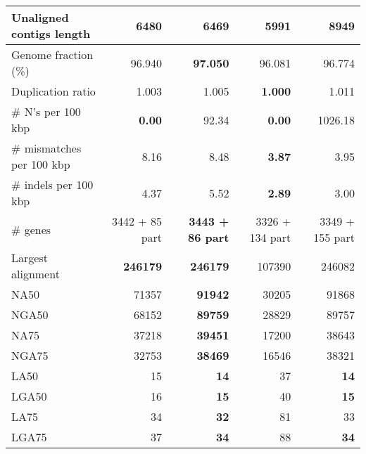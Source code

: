 \documentclass[12pt,a4paper]{article}
\begin{document}
\begin{table}[ht]
\begin{center}
\begin{tabular}{|l*{4}{|r}|}
Unaligned contigs length & 6480 & 6469 & {\bf 5991} & 8949 \\ \hline
Genome fraction (\%) & 96.940 & {\bf 97.050} & 96.081 & 96.774 \\ \hline
Duplication ratio & 1.003 & 1.005 & {\bf 1.000} & 1.011 \\ \hline
\# N's per 100 kbp & {\bf 0.00} & 92.34 & {\bf 0.00} & 1026.18 \\ \hline
\# mismatches per 100 kbp & 8.16 & 8.48 & {\bf 3.87} & 3.95 \\ \hline
\# indels per 100 kbp & 4.37 & 5.52 & {\bf 2.89} & 3.00 \\ \hline
\# genes & 3442 + 85 part & {\bf 3443 + 86 part} & 3326 + 134 part & 3349 + 155 part \\ \hline
Largest alignment & {\bf 246179} & {\bf 246179} & 107390 & 246082 \\ \hline
NA50 & 71357 & {\bf 91942} & 30205 & 91868 \\ \hline
NGA50 & 68152 & {\bf 89759} & 28829 & 89757 \\ \hline
NA75 & 37218 & {\bf 39451} & 17200 & 38643 \\ \hline
NGA75 & 32753 & {\bf 38469} & 16546 & 38321 \\ \hline
LA50 & 15 & {\bf 14} & 37 & {\bf 14} \\ \hline
LGA50 & 16 & {\bf 15} & 40 & {\bf 15} \\ \hline
LA75 & 34 & {\bf 32} & 81 & 33 \\ \hline
LGA75 & 37 & {\bf 34} & 88 & {\bf 34} \\ \hline
\end{tabular}
\end{center}
\end{table}
\end{document}

